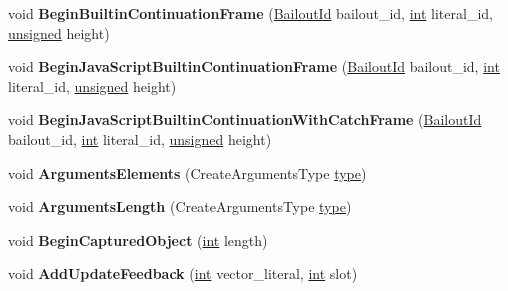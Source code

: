 \begin{DoxyCompactItemize}
void {\bfseries Begin\+Builtin\+Continuation\+Frame} (\mbox{\hyperlink{classv8_1_1internal_1_1BailoutId}{Bailout\+Id}} bailout\+\_\+id, \mbox{\hyperlink{classint}{int}} literal\+\_\+id, \mbox{\hyperlink{classunsigned}{unsigned}} height)
\item 
\mbox{\label{classv8_1_1internal_1_1Translation_a40bac84fe95c9ca4f53f116457a1548c}} 
void {\bfseries Begin\+Java\+Script\+Builtin\+Continuation\+Frame} (\mbox{\hyperlink{classv8_1_1internal_1_1BailoutId}{Bailout\+Id}} bailout\+\_\+id, \mbox{\hyperlink{classint}{int}} literal\+\_\+id, \mbox{\hyperlink{classunsigned}{unsigned}} height)
\item 
\mbox{\label{classv8_1_1internal_1_1Translation_aa2e7d9f98062fb43a5ac37419a84948e}} 
void {\bfseries Begin\+Java\+Script\+Builtin\+Continuation\+With\+Catch\+Frame} (\mbox{\hyperlink{classv8_1_1internal_1_1BailoutId}{Bailout\+Id}} bailout\+\_\+id, \mbox{\hyperlink{classint}{int}} literal\+\_\+id, \mbox{\hyperlink{classunsigned}{unsigned}} height)
\item 
\mbox{\label{classv8_1_1internal_1_1Translation_afeab692c60395febbaaea03dd7fb19e9}} 
void {\bfseries Arguments\+Elements} (Create\+Arguments\+Type \mbox{\hyperlink{classstd_1_1conditional_1_1type}{type}})
\item 
\mbox{\label{classv8_1_1internal_1_1Translation_a98065c091ebc1ebf2476d72db1fdad7c}} 
void {\bfseries Arguments\+Length} (Create\+Arguments\+Type \mbox{\hyperlink{classstd_1_1conditional_1_1type}{type}})
\item 
\mbox{\label{classv8_1_1internal_1_1Translation_a569a5a7758c2a91f71bc5dca5fb82a37}} 
void {\bfseries Begin\+Captured\+Object} (\mbox{\hyperlink{classint}{int}} length)
\item 
\mbox{\label{classv8_1_1internal_1_1Translation_afa2a2bc74c93f88695fafd222287630f}} 
void {\bfseries Add\+Update\+Feedback} (\mbox{\hyperlink{classint}{int}} vector\+\_\+literal, \mbox{\hyperlink{classint}{int}} slot)
\item 
\mbox{\label{classv8_1_1internal_1_1Translation_a182d5da607bff8f6efb68351277585e8}} 

\end{DoxyCompactItemize}
